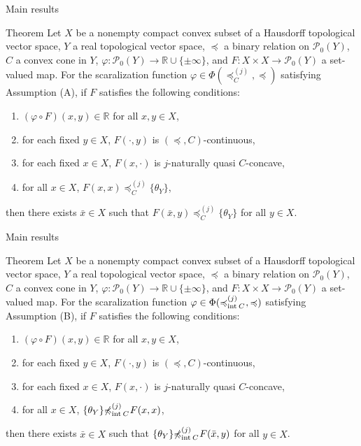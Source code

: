 \documentclass[aspectratio=169, dvipdfmx, 11pt]{beamer}
\newcommand{\RealNumberSet}{\mathbb{R}}
\newcommand{\Interior}[1]{\text{\rm int\:${#1}$}} %
\newcommand{\pow}[1]{\mathcal{P}_{0}(#1)}
\newcommand{\setrel}[2]{\preccurlyeq^{(#1)}_{#2}\!}
\newcommand{\notsetrel}[2]{{\not\preccurlyeq}^{(#1)}_{#2}\!}
\begin{document}
\begin{frame}{Main results}
  \begin{block}{Theorem}
    Let $X$ be a nonempty compact convex subset of a Hausdorff topological vector space,
    $Y$ a real topological vector space, $\preccurlyeq$ a binary relation on $\pow{Y}$,
    $C$ a convex cone in $Y$, $\varphi\colon \pow{Y} \to \RealNumberSet \cup \{\pm \infty\}$,
    and $F\colon X \times X \to \pow{Y}$ a set-valued map.
    For the scaralization function $\varphi \in \Phi(\setrel{j}{C}, \preccurlyeq)$ satisfying Assumption (A),
    if $F$ satisfies the following conditions:
    \begin{enumerate}
      \item $(\varphi \circ F)(x,y) \in \RealNumberSet$ for all $x,y \in X$,
      \item for each fixed $y \in X$, $F(\cdot,y)$ is $(\preccurlyeq, C)$-continuous,
      \item for each fixed $x \in X$, $F(x,\cdot)$ is $j$-naturally quasi $C$-concave,
      \item for all $x \in X$, $F(x,x) \setrel{j}{C} \{\theta_Y\}$,
    \end{enumerate}
    then there exists $\bar{x} \in X$ such that $ F(\bar{x},y) \setrel{j}{C} \{\theta_Y\} $ for all $y \in X$.
  \end{block}
\end{frame}

\begin{frame}{Main results}
  \begin{block}{Theorem}
    Let $X$ be a nonempty compact convex subset of a Hausdorff topological vector space,
    $Y$ a real topological vector space, $\preccurlyeq$ a binary relation on $\pow{Y}$,
    $C$ a convex cone in $Y$, $\varphi\colon \pow{Y} \to \RealNumberSet \cup \{\pm \infty\}$,
    and $F\colon X \times X \to \pow{Y}$ a set-valued map.
    For the scaralization function $\varphi \in \Phi(\setrel{j}{\Interior{C}}\:, \preccurlyeq)$ satisfying Assumption (B),
    if $F$ satisfies the following conditions:
    \begin{enumerate}
      \item $(\varphi \circ F)(x,y) \in \RealNumberSet$ for all $x,y \in X$,
      \item for each fixed $y \in X$, $F(\cdot,y)$ is $(\preccurlyeq, C)$-continuous,
      \item for each fixed $x \in X$, $F(x,\cdot)$ is $j$-naturally quasi $C$-concave,
      \item for all $x \in X$, $\{\theta_Y\} \notsetrel{j}{\Interior{C}}\: F(x,x) $,
    \end{enumerate}
    then there exists $\bar{x} \in X$ such that $\{\theta_Y\} \notsetrel{j}{\Interior{C}}\: F(\bar{x},y)$
    for all $y \in X$.
  \end{block}
\end{frame}
\end{document}
